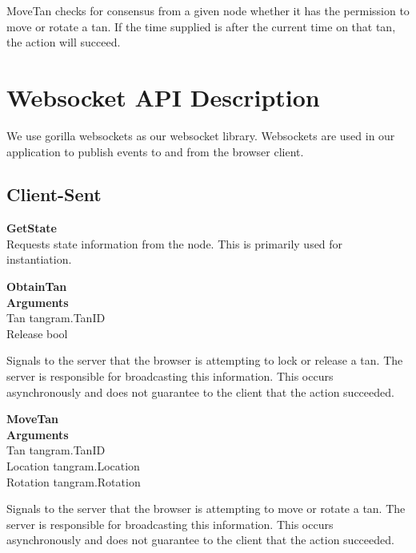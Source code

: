 \documentclass[twocolumn]{article}
\begin{document}
MoveTan checks for consensus from a given node whether it has the permission to move or rotate a tan. If the time supplied is after the current time on that tan, the action will succeed.

\section{Websocket API Description}
We use gorilla websockets as our websocket library. Websockets are used in our application to publish events to and from the browser client.

\subsection{Client-Sent}
\noindent
\textbf{\large GetState}\\
Requests state information from the node. This is primarily used for instantiation.

\begin{flushleft}
\textbf{\large ObtainTan}\\
\textbf{Arguments}\\
\hspace*{1em}Tan tangram.TanID\\
\hspace*{1em}Release bool
\end{flushleft}

Signals to the server that the browser is attempting to lock or release a tan. The server is responsible for broadcasting this information. This occurs asynchronously and does not guarantee to the client that the action succeeded.

\begin{flushleft}
\textbf{\large MoveTan}\\
\textbf{Arguments}\\
\hspace*{1em}Tan tangram.TanID\\
\hspace*{1em}Location tangram.Location\\
\hspace*{1em}Rotation tangram.Rotation
\end{flushleft}

Signals to the server that the browser is attempting to move or rotate a tan. The server is responsible for broadcasting this information. This occurs asynchronously and does not guarantee to the client that the action succeeded.
\end{document}
